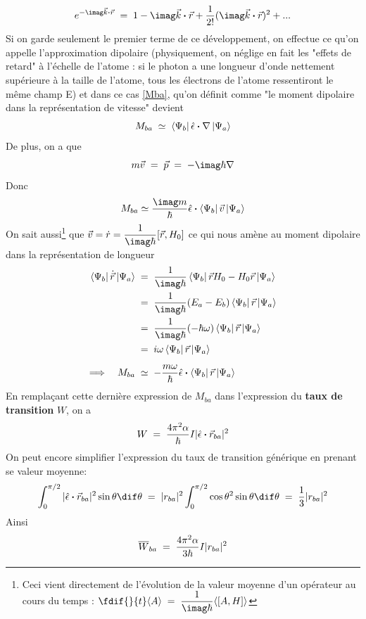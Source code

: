 \begin{equation}
    e^{-\imag\vec{k}\Cdot\vec{r}}\eq 1-\imag\vec{k}\Cdot\vec{r}+\dfrac{1}{2!}(\imag\vec{k}\Cdot\vec{r})^2+...
    \label{eq:dvpl_expo}
\end{equation}
Si on garde seulement le premier terme de ce développement, on effectue ce qu'on appelle l'approximation dipolaire (physiquement, on néglige en fait les "effets de retard" à l'échelle de l'atome : si le photon a une longueur d'onde nettement supérieure à la taille de l'atome, tous les électrons de l'atome ressentiront le même champ E) et dans ce cas \eqref{Mba}, qu'on définit comme "le moment dipolaire dans la représentation de vitesse" devient
\[
    M_{ba} \;\simeq\; \bra{\Psi_b}\hat{\epsilon}\boldsymbol{\cdot}\nabla\ket{\Psi_a}
\]
De plus, on a que
\[
    m\vec{v}\eq \vec{p}\eq -\imag\hbar \nabla
\]
Donc
\[
    M_{ba} \simeq \dfrac{\imag m}{\hbar}\hat{\epsilon}\Cdot\bra{\Psi_b}\vec{v}\ket{\Psi_a}
\]
On sait aussi\footnote{Ceci vient directement de l'évolution de la valeur moyenne d'un opérateur au cours du temps : $\fdif{}{t}\langle A \rangle \eq \dfrac{1}{\imag\hbar}\langle[A,H] \rangle$} que $\vec{v}=\dot{r}=\dfrac{1}{\imag\hbar}[\vec{r},H_0]$ ce qui nous amène au moment dipolaire dans la représentation de longueur
\begin{align*}
    \bra{\Psi_b}\dot{\vec{r}}\ket{\Psi_a}
    &\eq
    \dfrac{1}{\imag\hbar}\bra{\Psi_b}\vec{r}H_0-H_0\vec{r}\ket{\Psi_a}\\
    &\eq
    \dfrac{1}{\imag\hbar}(E_a-E_b)\bra{\Psi_b}\vec{r}\ket{\Psi_a}\\
    &\eq
    \dfrac{1}{\imag\hbar}(-\hbar \omega)\bra{\Psi_b}\vec{r}\ket{\Psi_a} \\
    &\eq
    i \omega \bra{\Psi_b}\vec{r}\ket{\Psi_a} \\[5pt]
    \Longrightarrow \quad M_{ba} &\;\simeq\;
    -\dfrac{m \omega}{\hbar}\hat{\epsilon}\Cdot\bra{\Psi_b}\vec{r}\ket{\Psi_a}
\end{align*}
En remplaçant cette dernière expression de $M_{ba}$ dans l'expression du \textbf{taux de transition} $W$, on a
\[
    W\; = \; \dfrac{4\pi^2 \alpha}{\hbar}I |\hat{\epsilon}\boldsymbol{\cdot}\vec{r}_{ba}|^2
\]
On peut encore simplifier l'expression du taux de transition générique en prenant se valeur moyenne:
\[
    \int_{0}^{\pi/2} |\hat{\epsilon}\Cdot\vec{r}_{ba}|^2\sin{\theta} \dif\theta\eq |r_{ba}|^2\int_{0}^{\pi/2}\cos{\theta}^2\sin{\theta}\dif\theta\eq \dfrac{1}{3}|r_{ba}|^2
\]
Ainsi
\begin{equation}
    \overline{W}_{ba}\; = \; \dfrac{4\pi^2 \alpha}{3 \hbar}I |r_{ba}|^2
\end{equation}



